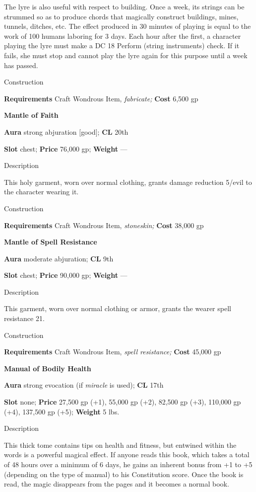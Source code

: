 The lyre is also useful with respect to building. Once a week, its strings can be strummed so as to produce chords that magically construct buildings, mines, tunnels, ditches, etc. The effect produced in 30 minutes of playing is equal to the work of 100 humans laboring for 3 days. Each hour after the first, a character playing the lyre must make a DC 18 Perform (string instruments) check. If it fails, she must stop and cannot play the lyre again for this purpose until a week has passed. 
				
Construction
				
\textbf{Requirements} Craft Wondrous Item,\textit{ fabricate;}\textbf{ Cost }6,500 gp
				
\textbf{Mantle of Faith}
				
\textbf{Aura} strong abjuration \mbox{$[$}good\mbox{$]$};\textbf{ CL }20th
				
\textbf{Slot} chest; \textbf{Price} 76,000 gp; \textbf{Weight }---
				
Description
				
This holy garment, worn over normal clothing, grants damage reduction 5/evil to the character wearing it. 
				
Construction
				
\textbf{Requirements} Craft Wondrous Item,\textit{ stoneskin;}\textbf{ Cost }38,000 gp
				
\textbf{Mantle of Spell Resistance}
				
\textbf{Aura} moderate abjuration;\textbf{ CL }9th
				
\textbf{Slot} chest; \textbf{Price} 90,000 gp; \textbf{Weight }---
				
Description
				
This garment, worn over normal clothing or armor, grants the wearer spell resistance 21. 
				
Construction
				
\textbf{Requirements} Craft Wondrous Item,\textit{ spell resistance;}\textbf{ Cost }45,000 gp
				
\textbf{Manual of Bodily Health}
				
\textbf{Aura} strong evocation (if \textit{miracle} is used);\textbf{ CL }17th
				
\textbf{Slot} none; \textbf{Price} 27,500 gp (+1), 55,000 gp (+2), 82,500 gp (+3), 110,000 gp (+4), 137,500 gp (+5); \textbf{Weight} 5 lbs.
				
Description
				
This thick tome contains tips on health and fitness, but entwined within the words is a powerful magical effect. If anyone reads this book, which takes a total of 48 hours over a minimum of 6 days, he gains an inherent bonus from +1 to +5 (depending on the type of manual) to his Constitution score. Once the book is read, the magic disappears from the pages and it becomes a normal book. 
				
